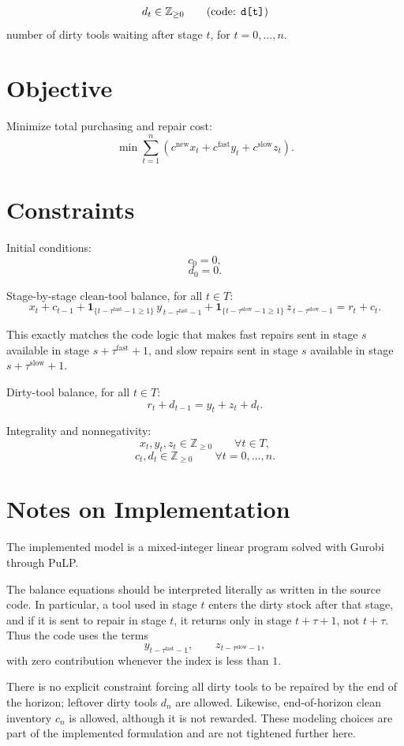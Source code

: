 \[
d_t \in \mathbb{Z}_{\ge 0}
\qquad \text{(code: \texttt{d[t]})}
\]
number of dirty tools waiting after stage \(t\), for \(t=0,\dots,n\).

\section*{Objective}

Minimize total purchasing and repair cost:
\[
\min \sum_{t=1}^n \left(c^{\text{new}} x_t + c^{\text{fast}} y_t + c^{\text{slow}} z_t\right).
\]

\section*{Constraints}

Initial conditions:
\[
c_0 = 0,
\]
\[
d_0 = 0.
\]

Stage-by-stage clean-tool balance, for all \(t \in T\):
\[
x_t + c_{t-1}
+ \mathbf{1}_{\{t-\tau^{\text{fast}}-1 \ge 1\}}\, y_{\,t-\tau^{\text{fast}}-1}
+ \mathbf{1}_{\{t-\tau^{\text{slow}}-1 \ge 1\}}\, z_{\,t-\tau^{\text{slow}}-1}
= r_t + c_t .
\]

This exactly matches the code logic that makes fast repairs sent in stage \(s\) available in stage \(s+\tau^{\text{fast}}+1\), and slow repairs sent in stage \(s\) available in stage \(s+\tau^{\text{slow}}+1\).

Dirty-tool balance, for all \(t \in T\):
\[
r_t + d_{t-1} = y_t + z_t + d_t .
\]

Integrality and nonnegativity:
\[
x_t,y_t,z_t \in \mathbb{Z}_{\ge 0} \qquad \forall t\in T,
\]
\[
c_t,d_t \in \mathbb{Z}_{\ge 0} \qquad \forall t=0,\dots,n.
\]

\section*{Notes on Implementation}

The implemented model is a mixed-integer linear program solved with Gurobi through PuLP.

The balance equations should be interpreted literally as written in the source code. In particular, a tool used in stage \(t\) enters the dirty stock after that stage, and if it is sent to repair in stage \(t\), it returns only in stage \(t+\tau+1\), not \(t+\tau\). Thus the code uses the terms
\[
y_{t-\tau^{\text{fast}}-1}, \qquad z_{t-\tau^{\text{slow}}-1},
\]
with zero contribution whenever the index is less than \(1\).

There is no explicit constraint forcing all dirty tools to be repaired by the end of the horizon; leftover dirty tools \(d_n\) are allowed. Likewise, end-of-horizon clean inventory \(c_n\) is allowed, although it is not rewarded. These modeling choices are part of the implemented formulation and are not tightened further here.
